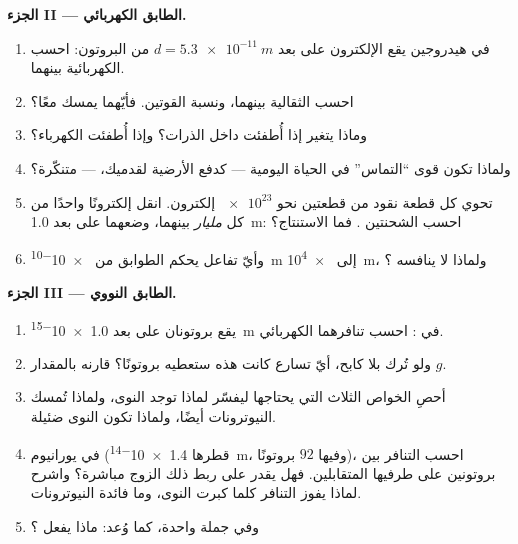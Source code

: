 \begin{problem}
\medskip
\noindent\textbf{الجزء II --- الطابق الكهربائي.}
\begin{enumerate}[resume]
  \item في  هيدروجين يقع الإلكترون على بعد $d = \qty{5.3e-11}{m}$
        من البروتون: احسب  الكهربائية بينهما.
  \item احسب  الثقالية بينهما، ونسبة
        القوتين. فأيّهما يمسك  معًا؟
  \item وماذا يتغير إذا أُطفئت  داخل الذرات؟ وإذا أُطفئت
        الكهرباء؟
  \item ولماذا تكون قوى ``التماس'' في الحياة اليومية --- كدفع الأرضية
        لقدميك،  ---  متنكّرة؟
  \item تحوي كل قطعة نقود من قطعتين نحو $\num{e23}$ إلكترون. انقل
        إلكترونًا واحدًا من كل \emph{مليار} بينهما، وضعهما على بعد
        \qty{1.0}{m}: احسب الشحنتين . فما الاستنتاج؟
  \item وأيّ تفاعل يحكم الطوابق من \qty{e-10}{m} إلى
        \qty{e4}{m}، ولماذا لا ينافسه ؟
\end{enumerate}

\medskip
\noindent\textbf{الجزء III --- الطابق النووي.}
\begin{enumerate}[resume]
  \item يقع بروتونان على بعد \qty{1.0e-15}{m} في : احسب
        تنافرهما الكهربائي.
  \item ولو تُرك بلا كابح، أيّ تسارع كانت هذه  ستعطيه بروتونًا؟
        قارنه بالمقدار $g$.
  \item أحصِ الخواص الثلاث التي يحتاجها 
        ليفسّر لماذا توجد النوى، ولماذا تُمسك النيوترونات أيضًا، ولماذا
        تكون النوى ضئيلة.
  \item في  يورانيوم (قطرها \qty{1.4e-14}{m}، وفيها $92$ بروتونًا)،
        احسب التنافر بين بروتونين على طرفيها المتقابلين. فهل يقدر
         على ربط ذلك الزوج مباشرة؟ واشرح لماذا
        يفوز التنافر كلما كبرت النوى، وما فائدة النيوترونات.
  \item وفي جملة واحدة، كما وُعد: ماذا يفعل ؟
\end{enumerate}


\end{problem}
